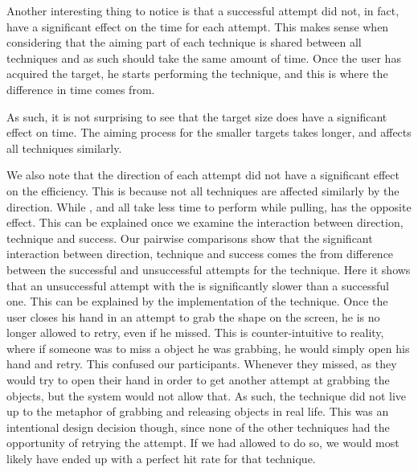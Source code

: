 Another interesting thing to notice is that a successful attempt did not, in fact, have a significant effect on the time for each attempt.
This makes sense when considering that the aiming part of each technique is shared between all techniques and as such should take the same amount of time.
Once the user has acquired the target, he starts performing the technique, and this is where the difference in time comes from.

As such, it is not surprising to see that the target size does have a significant effect on time.
The aiming process for the smaller targets takes longer, and affects all techniques similarly.

We also note that the direction of each attempt did not have a significant effect on the efficiency. 
This is because not all techniques are affected similarly by the direction. 
While \swipe, \throw and \tilt all take less time to perform while pulling, \grab has the opposite effect.
This can be explained once we examine the interaction between direction, technique and success.
Our pairwise comparisons show that the significant interaction between direction, technique and success comes the from difference between the successful and unsuccessful attempts for the \grab \pull technique. 
Here it shows that an unsuccessful attempt with the \grab \pull is significantly slower than a successful one. 
This can be explained by the implementation of the technique. 
Once the user closes his hand in an attempt to grab the shape on the screen, he is no longer allowed to retry, even if he missed.
This is counter-intuitive to reality, where if someone was to miss a object he was grabbing, he would simply open his hand and retry.
This confused our participants. 
Whenever they missed, as they would try to open their hand in order to get another attempt at grabbing the objects, but the system would not allow that.
As such, the \grab \pull technique did not live up to the metaphor of grabbing and releasing objects in real life.
This was an intentional design decision though, since none of the other techniques had the opportunity  of retrying the attempt.
If we had allowed \grab \pull to do so, we would most likely have ended up with a perfect hit rate for that technique. 

